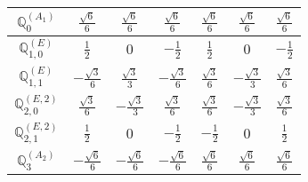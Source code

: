 \documentclass[fleqn,10pt,landscape]{article}
\begin{document}
\begin{itemize}
{\begin{center}
\begin{longtable}{ccccccc}
$\mathbb{Q}_{0}^{(A_{1})}$ & $ \frac{\sqrt{6}}{6} $ & $ \frac{\sqrt{6}}{6} $ & $ \frac{\sqrt{6}}{6} $ & $ \frac{\sqrt{6}}{6} $ & $ \frac{\sqrt{6}}{6} $ & $ \frac{\sqrt{6}}{6} $ \\ \hline
$\mathbb{Q}_{1,0}^{(E)}$ & $ \frac{1}{2} $ & $ 0 $ & $ - \frac{1}{2} $ & $ \frac{1}{2} $ & $ 0 $ & $ - \frac{1}{2} $ \\ \hline
$\mathbb{Q}_{1,1}^{(E)}$ & $ - \frac{\sqrt{3}}{6} $ & $ \frac{\sqrt{3}}{3} $ & $ - \frac{\sqrt{3}}{6} $ & $ \frac{\sqrt{3}}{6} $ & $ - \frac{\sqrt{3}}{3} $ & $ \frac{\sqrt{3}}{6} $ \\ \hline
$\mathbb{Q}_{2,0}^{(E,2)}$ & $ \frac{\sqrt{3}}{6} $ & $ - \frac{\sqrt{3}}{3} $ & $ \frac{\sqrt{3}}{6} $ & $ \frac{\sqrt{3}}{6} $ & $ - \frac{\sqrt{3}}{3} $ & $ \frac{\sqrt{3}}{6} $ \\ \hline
$\mathbb{Q}_{2,1}^{(E,2)}$ & $ \frac{1}{2} $ & $ 0 $ & $ - \frac{1}{2} $ & $ - \frac{1}{2} $ & $ 0 $ & $ \frac{1}{2} $ \\ \hline
$\mathbb{Q}_{3}^{(A_{2})}$ & $ - \frac{\sqrt{6}}{6} $ & $ - \frac{\sqrt{6}}{6} $ & $ - \frac{\sqrt{6}}{6} $ & $ \frac{\sqrt{6}}{6} $ & $ \frac{\sqrt{6}}{6} $ & $ \frac{\sqrt{6}}{6} $ \\
\end{longtable}
\end{center}
}
\end{itemize}
\end{document}
